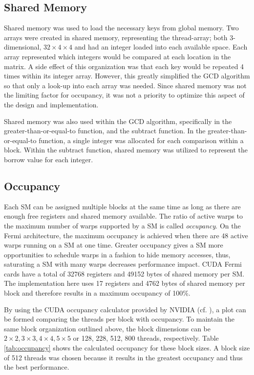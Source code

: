\documentclass[10pt, conference]{./IEEEtran}
\begin{document}
\subsection{Shared Memory}
Shared memory was used to load the necessary keys from global memory. Two 
arrays were created in shared memory, representing the thread-array; both 
3-dimensional, $32\times4\times4$ and had an integer loaded into each 
available space. Each array represented which integers would be compared at 
each location in the matrix. A side effect of this organization was that each key would be 
repeated 4 times within its integer array. However, this greatly simplified 
the GCD algorithm so that only a look-up into each array was needed. Since 
shared memory was not the limiting factor for occupancy, it was not a priority 
to optimize this aspect of the design and implementation. 

Shared memory was also used within the GCD algorithm, specifically in the 
greater-than-or-equal-to function, and the subtract function. In the 
greater-than-or-equal-to function, a single integer was allocated for each 
comparison within a block. Within the subtract function, shared memory was 
utilized to represent the borrow value for each integer. 

\subsection{Occupancy}
\label{sec:Occupancy}
Each SM can be assigned multiple blocks at the same time as long as there are 
enough free registers and shared memory available. The ratio of active warps 
to the maximum number of warps supported by a SM is called \emph{occupancy}. 
On the Fermi architecture, the maximum occupancy is achieved when there are 48 
active warps running on a SM at one time. Greater occupancy gives a SM more
opportunities to schedule warps in a fashion to hide memory accesses, thus,
saturating a SM with many warps decreases performance impact. CUDA Fermi cards
have a total of 32768 registers and 49152 bytes of shared memory per SM. The
implementation here uses 17 registers and 4762 bytes of shared memory per
block and therefore results in a maximum occupancy of 100\%.

By using the CUDA occupancy calculator provided by NVIDIA (cf. 
\cite{nvidia2012gpu}), a plot can be formed comparing the threads per block 
with occupancy. To maintain the same block organization outlined above, the 
block dimensions can be $2\times2, 3\times3, 4\times4, 5\times5$ or 128, 228, 
512, 800 threads, respectively. Table \ref{tab:occupancy} shows the calculated 
occupancy for these block sizes. A block size of 512 threads was chosen 
because it results in the greatest occupancy and thus the best performance. 
\end{document}
